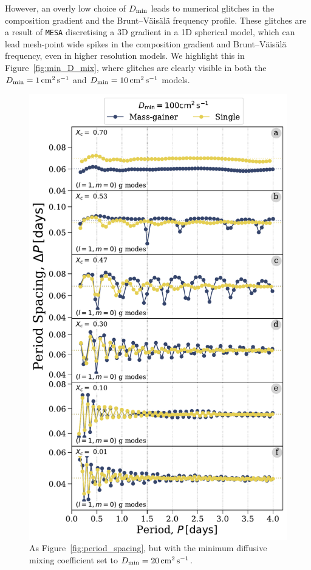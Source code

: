 \documentclass[desactivate]{aa}
\begin{document}
However, an overly low choice of $D_{\rm min}$ leads to numerical glitches in the composition gradient and the Brunt–Väisälä frequency profile. These glitches are a result of \texttt{MESA} discretising a 3D gradient in a 1D spherical model, which can lead mesh-point wide spikes in the composition gradient and Brunt–Väisälä frequency, even in higher resolution models. We highlight this in Figure~\ref{fig:min_D_mix}, where glitches are clearly visible in both the $D_{\rm min} = 1 \,{\rm cm^2 \, s^{-1}}$ and $D_{\rm min} = 10 \,{\rm cm^2 \, s^{-1}}$ models.

\begin{figure}[bt]
    \centering
    \includegraphics[width=\columnwidth]{figures/period_spacing_mdm100.pdf}
    \caption{As Figure~\ref{fig:period_spacing}, but with the minimum diffusive mixing coefficient set to $D_{\rm min} = 20 \,{\rm cm^2 \, s^{-1}}$.}
    \label{fig:period_spacing_mdm100}
\end{figure}
\end{document}
